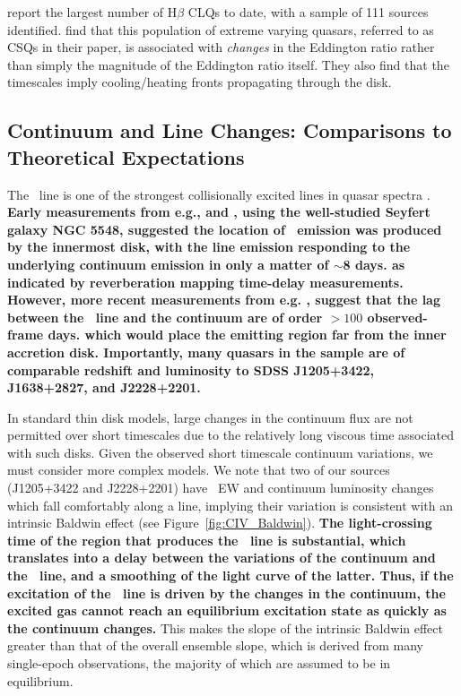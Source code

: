 \documentclass[fleqn,usenatbib]{mnras}
\begin{document}
\citet{Graham2020} report the largest number of H$\beta$ CLQs to
date, with a sample of 111 sources identified. \citet{Graham2020}
find that this population of extreme varying quasars, referred to as
CSQs in their paper, is associated with {\it changes} in the Eddington
ratio rather than simply the magnitude of the Eddington ratio itself.
They also find that the timescales imply cooling/heating fronts
propagating through the disk.


\subsection{Continuum and Line Changes: Comparisons to Theoretical Expectations}\label{sec:theory}
The \civ\ line is one of the strongest collisionally excited lines in
quasar spectra \citep[e.g.,][]{HamannFerland1999}.  {\bf Early
measurements from e.g., \citet{PoggePeterson1992} and
\citet{Peterson1997book}, using the well-studied Seyfert galaxy NGC
5548, suggested the location of \civ\ emission was produced by the
innermost disk, with the line emission responding to the underlying
continuum emission in only a matter of $\sim$8 days.  as indicated by
reverberation mapping time-delay measurements.  However, more recent
measurements from e.g. \citet[][and references therein]{Grier2019},
suggest that the lag between the \civ\ line and the continuum are of
order $>100$ observed-frame days.  which would place the \civ emitting
region far from the inner accretion disk.  Importantly, many quasars
in the \citet{Grier2019} sample are of comparable redshift and
luminosity to SDSS J1205+3422, J1638+2827, and J2228+2201.}

In standard \citet{SS73} thin disk models, large changes in the
continuum flux are not permitted over short timescales due to the
relatively long viscous time associated with such disks. Given the
observed short timescale continuum variations, we must consider more
complex models. We note that two of our sources (J1205+3422 and
J2228+2201) have \civ\ EW and continuum luminosity changes which fall
comfortably along a line, implying their variation is consistent with
an intrinsic Baldwin effect (see Figure~\ref{fig:CIV_Baldwin}).
{\bf The light-crossing time of the region that produces the \civ\ line is substantial,
which translates into a delay between the variations of the continuum and
the \civ\ line, and a smoothing of the light curve of the latter.
Thus, if the excitation of the \civ\ line is driven by the changes in the
continuum, the excited gas cannot reach an equilibrium
excitation state as quickly as the continuum changes.}
This makes the slope of the intrinsic Baldwin effect greater than that
of the overall ensemble slope, which is derived from many single-epoch
observations, the majority of which are assumed to be in equilibrium.
\end{document}
